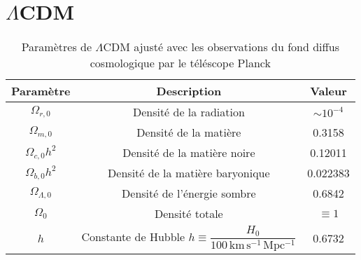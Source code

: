 \chapter{$\Lambda$CDM}\label{ref:lcdm}


\begin{table}[H]
        \centering
        \caption{Paramètres de $\Lambda$CDM ajusté avec les observations du fond diffus cosmologique par le téléscope Planck \citep{PlanckCollaboration2018}}
        \label{tab:cosmos}
        \begin{tabular}{ccc}
                \hline
                Paramètre & Description & Valeur \\\hline \hline
                $\Omega_{r,0}$ & Densité de la radiation & $\sim 10^{-4}$\\
                $\Omega_{m,0}$  &Densité de la matière & 0.3158 \\
                $\Omega_{c,0}h^{2}$  & Densité de la matière noire & 0.12011\\
                $\Omega_{b,0}h^{2}$ & Densité de la matière baryonique & 0.022383\\
                $\Omega_{\Lambda,0}$ &Densité de l'énergie sombre & 0.6842\\
                $\Omega_0$ & Densité totale & $\equiv 1$\\
                $h$ & Constante de Hubble $h \equiv \dfrac{H_0}{100\, \mathrm{km}\,\mathrm{s}^{-1}\, \mathrm{Mpc^{-1}}}$ & $0.6732$ \\
               \hline 
        \end{tabular}
\end{table}


